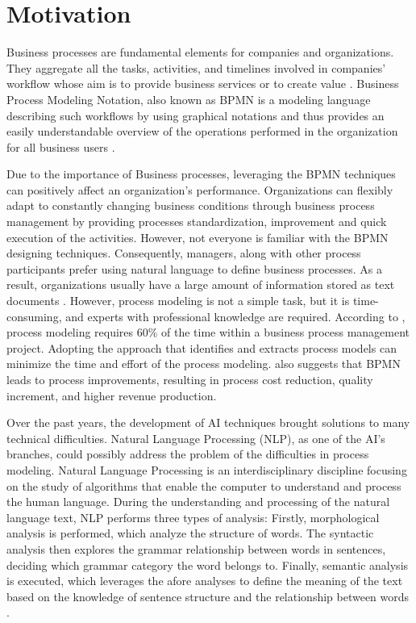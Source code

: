 \chapter{Motivation}

	Business processes are fundamental elements for companies and organizations. They aggregate all the tasks, activities, and timelines involved in companies' workflow whose aim is to provide business services or to create value \cite{literature_review_2}. Business Process Modeling Notation, also known as BPMN is a modeling language describing such workflows by using graphical notations and thus provides an easily understandable overview of the operations performed in the organization for all business users \cite{literature_review_1}. 
	
	Due to the importance of Business processes, leveraging the BPMN techniques can positively affect an organization's performance. Organizations can flexibly adapt to constantly changing business conditions through business process management by providing processes standardization, improvement and quick execution of the activities. \cite{t2m_5} However, not everyone is familiar with the BPMN designing techniques. Consequently, managers, along with other process participants prefer using natural language to define business processes. As a result, organizations usually have a large amount of information stored as text documents \cite{literature_review_2}. However, process modeling is not a simple task, but it is time-consuming, and experts with professional knowledge are required. According to \cite{t2m_5}, process modeling requires 60\% of the time within a business process management project. Adopting the approach that identifies and extracts process models can minimize the time and effort of the process modeling. \cite{literature_review_3} also suggests that  BPMN leads to process improvements, resulting in process cost reduction, quality increment, and higher revenue production. 
	
	Over the past years, the development of AI techniques brought solutions to many technical difficulties. Natural Language Processing (NLP), as one of the AI's branches, could possibly address the problem of the difficulties in process modeling. Natural Language Processing is an interdisciplinary discipline focusing on the study of algorithms that enable the computer to understand and process the human language\cite{t2m_3}. During the understanding and processing of the natural language text, NLP performs three types of analysis: Firstly, morphological analysis is performed, which analyze the structure of words. The syntactic analysis then explores the grammar relationship between words in sentences, deciding which grammar category the word belongs to. Finally, semantic analysis is executed, which leverages the afore analyses to define the meaning of the text based on the knowledge of sentence structure and the relationship between words \cite{literature_review_2}. 
	
